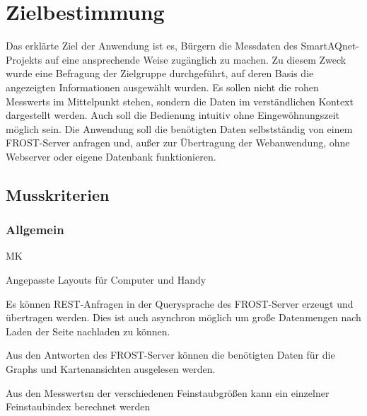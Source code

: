 \section{Zielbestimmung}
Das erklärte Ziel der Anwendung ist es, Bürgern die Messdaten des \gls{SmartAQnet}-Projekts auf eine ansprechende Weise zugänglich zu machen.
Zu diesem Zweck wurde eine Befragung der Zielgruppe durchgeführt, auf deren Basis die angezeigten Informationen ausgewählt wurden.
Es sollen nicht die rohen \glspl{Messwert} im Mittelpunkt stehen, sondern die Daten im verständlichen Kontext dargestellt werden.
Auch soll die Bedienung intuitiv ohne Eingewöhnungszeit möglich sein.
Die Anwendung soll die benötigten Daten selbstständig von einem \gls{FROST-Server} anfragen und, außer zur Übertragung der \gls{Webanwendung}, ohne \gls{Webserver} oder eigene Datenbank funktionieren.

\subsection{Musskriterien}
\setcounter{counter}{10}

\subsubsection*{Allgemein}
\begin{Kriterien}{MK}

	\item Angepasste Layouts für Computer und \gls{Handy}
	
	\item Es können REST-Anfragen in der \gls{Querysprache} des \gls{FROST-Server} erzeugt und übertragen werden.
		Dies ist auch asynchron möglich um große Datenmengen nach Laden der Seite nachladen zu können.
	
	\item Aus den Antworten des \gls{FROST-Server} können die benötigten Daten für die \glspl{Graph} und Kartenansichten ausgelesen werden.
	
	\item Aus den \glspl{Messwert}n der verschiedenen Feinstaubgrößen kann ein einzelner \gls{Feinstaubindex} berechnet werden
\end{Kriterien}

